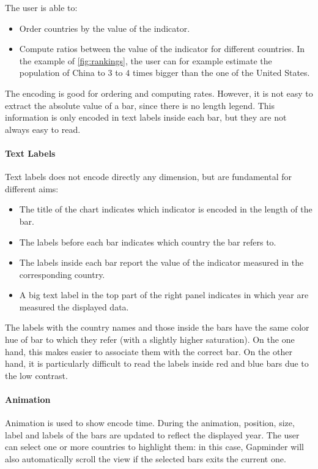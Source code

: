 The user is able to:
\begin{itemize}
	\item Order countries by the value of the indicator.
	\item Compute ratios between the value of the indicator for different countries. In the example of \cref{fig:rankings}, the user can for example estimate the population of China to $3$ to $4$ times bigger than the one of the United States.
\end{itemize}

The encoding is good for ordering and computing rates.
However, it is not easy to extract the absolute value of a bar, since there is no length legend.
This information is only encoded in text labels inside each bar, but they are not always easy to read.

\paragraph{Text Labels}
Text labels does not encode directly any dimension, but are fundamental for different aims:
\begin{itemize}
	\item The title of the chart indicates which indicator is encoded in the length of the bar.
	\item The labels before each bar indicates which country the bar refers to.
	\item The labels inside each bar report the value of the indicator measured in the corresponding country.
	\item A big text label in the top part of the right panel indicates in which year are measured the displayed data.
\end{itemize}

The labels with the country names and those inside the bars have the same color hue of bar to which they refer (with a slightly higher saturation).
On the one hand, this makes easier to associate them with the correct bar.
On the other hand, it is particularly difficult to read the labels inside red and blue bars due to the low contrast.

\paragraph{Animation}
Animation is used to show encode time.
During the animation, position, size, label and labels of the bars are updated to reflect the displayed year.
The user can select one or more countries to highlight them:
in this case, Gapminder will also automatically scroll the view if the selected bars exits the current one.

